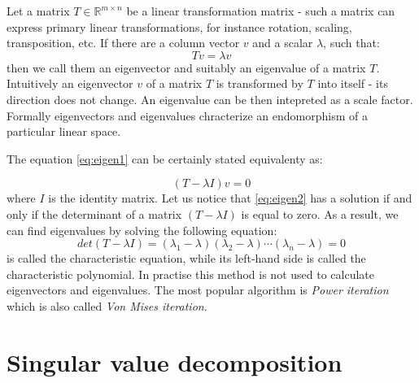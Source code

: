 \begin{appendices}
Let a matrix $T \in \mathbb{R}^{m \times n}$ be a linear transformation matrix - such a matrix can express primary linear transformations, for instance rotation, scaling, transposition, etc. If there are a column vector $v$ and a scalar $\lambda$, such that:
\begin{equation}\label{eq:eigen1}
    Tv=\lambda{v}
\end{equation}
then we call them an eigenvector and suitably an eigenvalue of a matrix $T$. Intuitively an eigenvector $v$ of a matrix $T$ is transformed by $T$ into itself - its direction does not change. An eigenvalue can be then intepreted as a scale factor. Formally eigenvectors and eigenvalues chracterize an endomorphism of a particular linear space.  

The equation \ref{eq:eigen1} can be certainly stated equivalenty as:

\begin{equation}\label{eq:eigen2}
    (T-\lambda{I})v=0
\end{equation}
where $I$ is the identity matrix. Let us notice that \cref{eq:eigen2} has a solution if and only if the determinant of a matrix $(T-\lambda{I})$ is equal to zero. As a result, we can find eigenvalues by solving the following equation:
\begin{equation}\label{eq:eigen3}
    det(T-\lambda{I}) = (\lambda_1-\lambda)(\lambda_2-\lambda)\cdots(\lambda_n-\lambda) = 0
\end{equation}
 is called the characteristic equation, while its left-hand side is called the characteristic polynomial. In practise this method is not used to calculate eigenvectors and eigenvalues. The most popular algorithm is \textit{Power iteration} which is also called \textit{Von Mises iteration}.


\newpage
\section{Singular value decomposition}
\label{app:svd}


\end{appendices}

